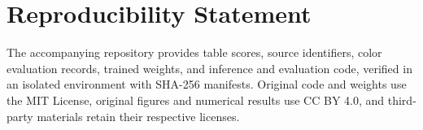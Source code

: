 \documentclass[10pt,twocolumn,journal]{IEEEtran}
\begin{document}
\section*{Reproducibility Statement}
The accompanying repository provides table scores, source identifiers, color evaluation records, trained weights, and inference and evaluation code, verified in an isolated environment with SHA-256 manifests. Original code and weights use the MIT License, original figures and numerical results use CC BY 4.0, and third-party materials retain their respective licenses.



\end{document}
